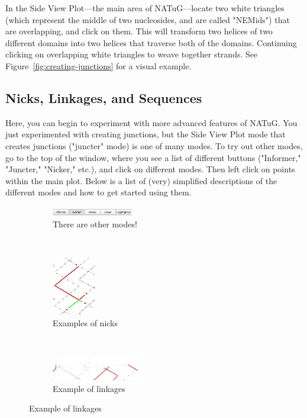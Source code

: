\documentclass[titlepage]{article}
\begin{document}
	In the Side View Plot---the main area of NATuG---locate two white triangles (which represent the middle of two nucleosides, and are called "NEMids") that are overlapping, and click on them. This will transform two helices of two different domains into two helices that traverse both of the domains. Continuing clicking on overlapping white triangles to weave together strands. See Figure~\ref{fig:creating-junctions} for a visual example.
	
	\subsection{Nicks, Linkages, and Sequences}
	Here, you can begin to experiment with more advanced features of NATuG. You just experimented with creating junctions, but the Side View Plot mode that creates junctions ("juncter" mode) is one of many modes. To try out other modes, go to the top of the window, where you see a list of different buttons ("Informer," "Juncter," "Nicker," etc.), and click on different modes. Then left click on points within the main plot. Below is a list of (very) simplified descriptions of the different modes and how to get started using them.
	
	\begin{figure}[h]
		\caption{Advanced NATuG features}
		\centering
		\begin{subfigure}{.3\textwidth}
			\centering
			\includegraphics[width=1.4in]{juncter-activated.png}
			\caption{There are other modes!}
		\end{subfigure}%
		~
		\begin{subfigure}{.3\textwidth}
			\centering
			\includegraphics[height=1in]{nick-examples.png}
			\caption{Examples of nicks}
		\end{subfigure}%
		~
		\begin{subfigure}{.3\textwidth}
			\centering
			\includegraphics[width=1.5in]{linkage-example.png}
			\caption{Example of linkages}
		\end{subfigure}
	\end{figure}
	
\end{document}
